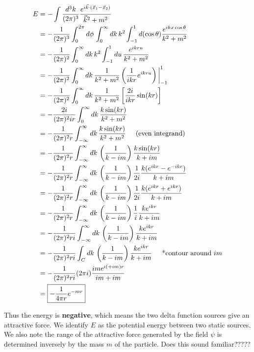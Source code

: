 \documentclass{book}
\theoremstyle{definition}
\newcommand{\f}[2]{\frac{#1}{#2}}
\newcommand{\lp}{\left(}
\newcommand{\rp}{\right)}
\newcommand{\lb}{\left[}
\newcommand{\rb}{\right]}
\begin{document}
\begin{align}\label{inverse-sq}
E &= -\int \f{d^3k}{(2\pi)^3}\f{e^{i\vec{k}\cdot(\vec{x}_1 - \vec{x}_2)}}{\vec{k}^2 + m^2} \nonumber\\
&= -\f{1}{(2\pi)^3}\int_0^{2\pi}d\phi\,\int^\infty_0 dk\,k^2 \int^{1}_{-1}d(\cos\theta)\f{e^{ikx\cos\theta}}{k^2 + m^2} \nonumber\\
&= -\f{1}{(2\pi)^2}\int^\infty_0 dk\,k^2 \int^{1}_{-1}du\,\f{e^{ikru}}{k^2 + m^2} \nonumber\\
&= -\f{1}{(2\pi)^2} \int^\infty_0 dk\,\f{1}{k^2 + m^2} \lp \f{1}{ikr}e^{ikru} \rp\bigg\vert^1_{-1}\nonumber\\
&= -\f{1}{(2\pi)^2} \int^\infty_0 dk\,\f{1}{k^2 + m^2} \lb \f{2i}{ikr}\sin(kr)\rb\nonumber\\
&= -\f{2i}{(2\pi)^2ir} \int^\infty_0 dk\,\f{k\sin (kr)}{k^2 + m^2}\nonumber\\
&= -\f{1}{(2\pi)^2r} \int^\infty_{-\infty}dk\,\f{k\sin (kr)}{k^2 + m^2} \hspace{0.5cm} \text{(even integrand)}\nonumber\\
&= -\f{1}{(2\pi)^2r} \int^\infty_{-\infty}dk\,\lp\f{1}{k - im}\rp\f{k\sin(kr)}{k + im}\nonumber\\
&= -\f{1}{(2\pi)^2r}\int^\infty_{-\infty}dk\,\lp\f{1}{k - im}\rp\f{1}{2i}\f{k(e^{ikr} - e^{-ikr})}{k + im} \nonumber\\
&= -\f{1}{(2\pi)^2r}\int^\infty_{-\infty}dk\,\lp\f{1}{k - im}\rp\f{1}{2i}\f{k(e^{ikr} + e^{ikr})}{k + im}\nonumber\\
&=  -\f{1}{(2\pi)^2r}\int^\infty_{-\infty}dk\,\lp\f{1}{k - im}\rp\f{1}{i}\f{k e^{ikr}}{k + im}\nonumber\\
&= -\f{1}{(2\pi)^2ri}\int^\infty_{-\infty}dk\,\lp\f{1}{k - im}\rp\f{k e^{ikr}}{k + im}\nonumber \\
&= -\f{1}{(2\pi)^2ri}\int_{C}dk\,\lp\f{1}{k - im}\rp\f{k e^{ikr}}{k + im} \hspace{0.5cm} \text{*contour around } im \nonumber\\
&= -\f{1}{(2\pi)^2ri}(2\pi i)\f{im e^{i(+im)r}}{im + im} \nonumber\\
&= \boxed{-\f{1}{4\pi r}e^{-mr}}
\end{align}

Thus the energy is \textbf{negative}, which means the two delta function sources give an attractive force. We identify $E$ as the potential energy between two static sources. We also note the range of the attractive force generated by the field $\psi$ is determined inversely by the mass $m$ of the particle. Does this sound familiar?????
\end{document}

